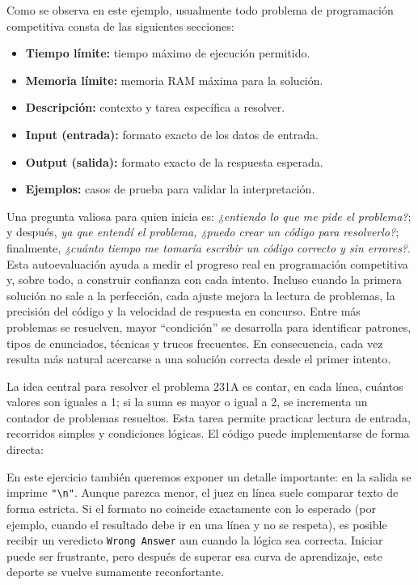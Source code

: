 Como se observa en este ejemplo, usualmente todo problema de programación competitiva consta de las siguientes secciones:
\begin{itemize}
    \item \textbf{Tiempo límite:} tiempo máximo de ejecución permitido.
    \item \textbf{Memoria límite:} memoria RAM máxima para la solución.
    \item \textbf{Descripción:} contexto y tarea específica a resolver.
    \item \textbf{Input (entrada):} formato exacto de los datos de entrada.
    \item \textbf{Output (salida):} formato exacto de la respuesta esperada.
    \item \textbf{Ejemplos:} casos de prueba para validar la interpretación.
\end{itemize}

Una pregunta valiosa para quien inicia es: \textit{¿entiendo lo que me pide el problema?}; y después, \textit{ya que entendí el problema, ¿puedo crear un código para resolverlo?}; finalmente, \textit{¿cuánto tiempo me tomaría escribir un código correcto y sin errores?}. Esta autoevaluación ayuda a medir el progreso real en programación competitiva y, sobre todo, a construir confianza con cada intento. Incluso cuando la primera solución no sale a la perfección, cada ajuste mejora la lectura de problemas, la precisión del código y la velocidad de respuesta en concurso. Entre más problemas se resuelven, mayor ``condición'' se desarrolla para identificar patrones, tipos de enunciados, técnicas y trucos frecuentes. En consecuencia, cada vez resulta más natural acercarse a una solución correcta desde el primer intento.

La idea central para resolver el problema 231A es contar, en cada línea, cuántos valores son iguales a 1; si la suma es mayor o igual a 2, se incrementa un contador de problemas resueltos. Esta tarea permite practicar lectura de entrada, recorridos simples y condiciones lógicas. El código puede implementarse de forma directa:


En este ejercicio también queremos exponer un detalle importante: en la salida se imprime \texttt{"\textbackslash n"}. Aunque parezca menor, el juez en línea suele comparar texto de forma estricta. Si el formato no coincide exactamente con lo esperado (por ejemplo, cuando el resultado debe ir en una línea y no se respeta), es posible recibir un veredicto \texttt{Wrong Answer} aun cuando la lógica sea correcta. Iniciar puede ser frustrante, pero después de superar esa curva de aprendizaje, este deporte se vuelve sumamente reconfortante.

